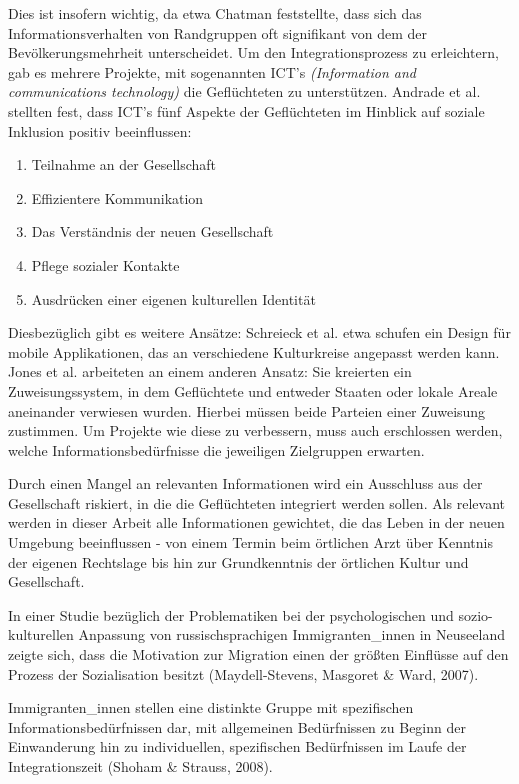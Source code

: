 Dies ist insofern wichtig, da etwa Chatman feststellte, dass sich das Informationsverhalten von Randgruppen oft signifikant von dem der Bev\"olkerungsmehrheit unterscheidet. \cite{chatman1996impoverished}
\newline
\newline 
Um den Integrationsprozess zu erleichtern, gab es mehrere Projekte, mit sogenannten ICT's \textit{(Information and communications technology)} die Geflüchteten zu unterstützen. Andrade et al. stellten fest, dass ICT's  f\"unf Aspekte der Gefl\"uchteten im Hinblick auf soziale Inklusion positiv beeinflussen:
\begin{enumerate}
    \item   Teilnahme an der Gesellschaft
    \item   Effizientere Kommunikation
    \item   Das Verst\"andnis der neuen Gesellschaft
    \item   Pflege sozialer Kontakte
    \item   Ausdr\"ucken einer eigenen kulturellen Identit\"at
\end{enumerate}
Diesbez\"uglich gibt es weitere Ans\"atze:\newline
Schreieck et al. etwa schufen ein Design f\"ur mobile Applikationen, das an verschiedene Kulturkreise angepasst werden kann. \cite{schreieck2017supporting}\newline
Jones et al. arbeiteten an einem anderen Ansatz: Sie kreierten ein Zuweisungssystem, in dem Gefl\"uchtete und entweder Staaten oder lokale Areale aneinander verwiesen wurden. Hierbei m\"ussen beide Parteien einer Zuweisung zustimmen. \cite{jones2017matching}\newline
Um Projekte wie diese zu verbessern, muss auch erschlossen werden, welche Informationsbed\"urfnisse die jeweiligen Zielgruppen erwarten.\newline

Durch einen Mangel an relevanten Informationen wird ein Ausschluss aus der Gesellschaft riskiert, in die die Gefl\"uchteten integriert werden sollen. \cite{andrade2016information}\newline
Als relevant werden in dieser Arbeit alle Informationen gewichtet, die das Leben in der neuen Umgebung beeinflussen - von einem Termin beim \"ortlichen Arzt \"uber Kenntnis der eigenen Rechtslage bis hin zur Grundkenntnis der \"ortlichen Kultur und Gesellschaft. \cite{schreieck2017supporting}\newline

In einer Studie bezüglich der Problematiken bei der
psychologischen und sozio-kulturellen Anpassung von russischsprachigen Immigranten_innen in Neuseeland zeigte sich, dass
die Motivation zur Migration einen der größten Einflüsse auf den Prozess
der Sozialisation besitzt (Maydell-Stevens, Masgoret & Ward, 2007).

Immigranten_innen stellen eine distinkte Gruppe mit spezifischen
Informationsbedürfnissen dar, mit allgemeinen Bedürfnissen zu Beginn
der Einwanderung hin zu individuellen, spezifischen Bedürfnissen im
Laufe der Integrationszeit (Shoham & Strauss, 2008).